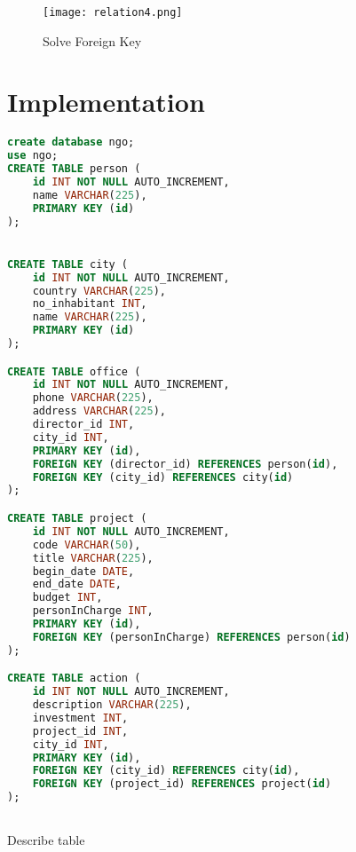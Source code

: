 \documentclass[12pt]{article}
\begin{document}
\begin{figure}[H]
  \texttt{[image: relation4.png]}
  \caption{Solve Foreign Key}
  \label{fig:relation4}
\end{figure}


\section{Implementation}
\begin{lstlisting}[language=SQL]
create database ngo;
use ngo;
CREATE TABLE person (
	id INT NOT NULL AUTO_INCREMENT,
	name VARCHAR(225),
	PRIMARY KEY (id)
);


CREATE TABLE city (
	id INT NOT NULL AUTO_INCREMENT,
	country VARCHAR(225),
	no_inhabitant INT,
	name VARCHAR(225),
	PRIMARY KEY (id)
);

CREATE TABLE office (
	id INT NOT NULL AUTO_INCREMENT,
	phone VARCHAR(225),
	address VARCHAR(225),
	director_id INT,
	city_id INT,
	PRIMARY KEY (id),
	FOREIGN KEY (director_id) REFERENCES person(id),
	FOREIGN KEY (city_id) REFERENCES city(id)
);

CREATE TABLE project (
	id INT NOT NULL AUTO_INCREMENT,
	code VARCHAR(50),
	title VARCHAR(225),
	begin_date DATE,
	end_date DATE,
	budget INT,
	personInCharge INT,
	PRIMARY KEY (id),
	FOREIGN KEY (personInCharge) REFERENCES person(id)
);

CREATE TABLE action (
	id INT NOT NULL AUTO_INCREMENT,
	description VARCHAR(225),
	investment INT,
	project_id INT,
	city_id INT,
	PRIMARY KEY (id),
	FOREIGN KEY (city_id) REFERENCES city(id),
	FOREIGN KEY (project_id) REFERENCES project(id)
);



\end{lstlisting}
Describe table
\end{document}
